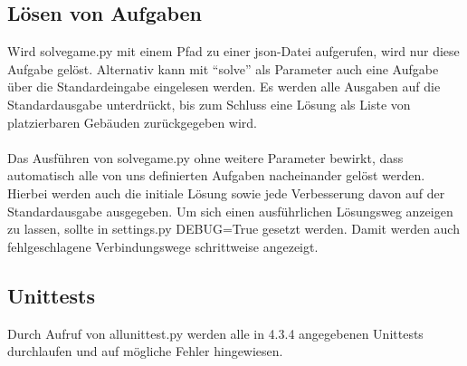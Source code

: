 \subsection{Lösen von Aufgaben}
Wird solve\textunderscore{}game.py mit einem Pfad zu einer json-Datei aufgerufen, wird nur diese Aufgabe gelöst. Alternativ kann mit “solve” als Parameter auch eine Aufgabe über die Standardeingabe eingelesen werden. Es werden alle Ausgaben auf die Standardausgabe unterdrückt, bis zum Schluss eine Lösung als Liste von platzierbaren Gebäuden zurückgegeben wird. 
\\\\
Das Ausführen von solve\textunderscore{}game.py ohne weitere Parameter bewirkt, dass automatisch alle von uns definierten Aufgaben nacheinander gelöst werden. Hierbei werden auch die initiale Lösung sowie jede Verbesserung davon auf der Standardausgabe ausgegeben. Um sich einen ausführlichen Lösungsweg anzeigen zu lassen, sollte in settings.py DEBUG=True gesetzt werden. Damit werden auch fehlgeschlagene Verbindungswege schrittweise angezeigt.

\subsection{Unittests}
Durch Aufruf von all\textunderscore{}unit\textunderscore{}test.py werden alle in 4.3.4 angegebenen Unittests durchlaufen und auf mögliche Fehler hingewiesen.
